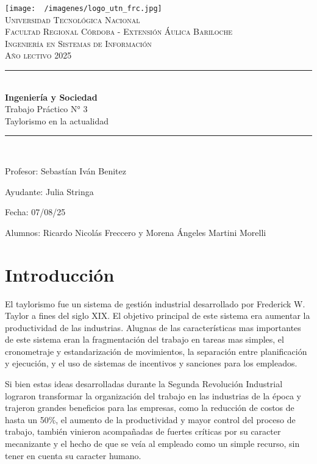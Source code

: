 \documentclass[12pt]{article}
\begin{document}
  \begin{titlepage}
    \centering
    \texttt{[image: ~/imagenes/logo\_utn\_frc.jpg]}\\

    \textsc{
      \LARGE Universidad Tecnológica Nacional\\
      \Large Facultad Regional Córdoba - Extensión Áulica Bariloche\\
      \large Ingeniería en Sistemas de Información\\
      Año lectivo 2025\\[0.5cm]
    }

    \rule{\linewidth}{1.0mm}\\[0.4cm]
    \Huge
    \textbf{Ingeniería y Sociedad}\\
    Trabajo Práctico N° 3\\[0.2cm]
    \LARGE
    Taylorismo en la actualidad
    \rule{\linewidth}{1.0mm}\\
    \large
    \begin{flushleft}
      Profesor: Sebastían Iván Benitez

      Ayudante: Julia Stringa

      Fecha: 07/08/25
    \end{flushleft}

    \vfill
    \begin{flushright}
      Alumnos: Ricardo Nicolás Freccero y Morena Ángeles Martini Morelli

    \end{flushright}
  \end{titlepage}

  \restoregeometry
  \tableofcontents
  \newpage

  \section{Introducción}
  El taylorismo fue un sistema de gestión industrial desarrollado por Frederick W. Taylor a fines del siglo XIX. El objetivo principal de este sistema era aumentar la productividad de las industrias. Alugnas de las características mas importantes de este sistema eran la fragmentación del trabajo en tareas mas simples, el cronometraje y estandarización de movimientos, la separación entre planificación y ejecución, y el uso de sistemas de incentivos y sanciones para los empleados. 

  Si bien estas ideas desarrolladas durante la Segunda Revolución Industrial lograron transformar la organización del trabajo en las industrias de la época y trajeron grandes beneficios para las empresas, como la reducción de costos de hasta un 50\%, el aumento de la productividad y mayor control del proceso de trabajo, también vinieron acompañadas de fuertes críticas por su caracter mecanizante y el hecho de que se veía al empleado como un simple recurso, sin tener en cuenta su caracter humano.
\end{document}
